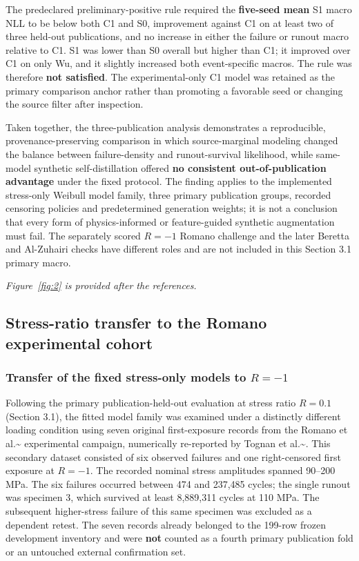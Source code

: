 \documentclass[12pt,a4paper]{article}
\begin{document}
The predeclared preliminary-positive rule required the \textbf{five-seed mean} S1 macro NLL to be below both C1 and S0, improvement against C1 on at least two of three held-out publications, and no increase in either the failure or runout macro relative to C1. S1 was lower than S0 overall but higher than C1; it improved over C1 on only Wu, and it slightly increased both event-specific macros. The rule was therefore \textbf{not satisfied}. The experimental-only C1 model was retained as the primary comparison anchor rather than promoting a favorable seed or changing the source filter after inspection.

Taken together, the three-publication analysis demonstrates a reproducible, provenance-preserving comparison in which source-marginal modeling changed the balance between failure-density and runout-survival likelihood, while same-model synthetic self-distillation offered \textbf{no consistent out-of-publication advantage} under the fixed protocol. The finding applies to the implemented stress-only Weibull model family, three primary publication groups, recorded censoring policies and predetermined generation weights; it is not a conclusion that every form of physics-informed or feature-guided synthetic augmentation must fail. The separately scored \(R=-1\) Romano challenge and the later Beretta and Al-Zuhairi checks have different roles and are not included in this Section 3.1 primary macro.


\noindent\textit{Figure~\ref{fig:2} is provided after the references.}\par


\subsection{Stress-ratio transfer to the Romano experimental cohort}

\subsubsection{Transfer of the fixed stress-only models to \(R=-1\)}

Following the primary publication-held-out evaluation at stress ratio \(R=0.1\) (Section 3.1), the fitted model family was examined under a distinctly different loading condition using seven original first-exposure records from the Romano et al.\textasciitilde{}\cite{romano2018} experimental campaign, numerically re-reported by Tognan et al.\textasciitilde{}\cite{tognan2023}. This secondary dataset consisted of six observed failures and one right-censored first exposure at \(R=-1\). The recorded nominal stress amplitudes spanned 90–200 MPa. The six failures occurred between 474 and 237,485 cycles; the single runout was specimen 3, which survived at least 8,889,311 cycles at 110 MPa. The subsequent higher-stress failure of this same specimen was excluded as a dependent retest. The seven records already belonged to the 199-row frozen development inventory and were \textbf{not} counted as a fourth primary publication fold or an untouched external confirmation set.
\end{document}
